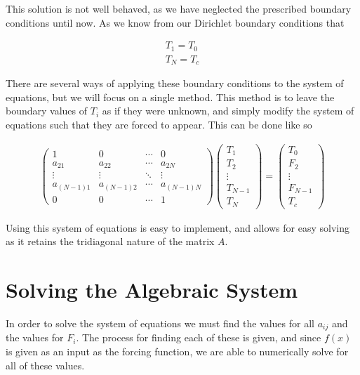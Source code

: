 \documentclass[10pt]{amsart}
\numberwithin{equation}{section}
\theoremstyle{definition}
\begin{document}
\begin{multicols}{2}
This solution is not well behaved, as we have neglected the prescribed boundary
conditions until now. As we know from our Dirichlet boundary conditions that

\begin{align*}
  T_1=T_0\\
  T_N=T_c
\end{align*}

There are several ways of applying these boundary conditions to the system of
equations, but we will focus on a single method. This method is to leave the
boundary values of $T_i$ as if they were unknown, and simply modify the system
of equations such that they are forced to appear. This can be done like so

\begin{align*}
  \begin{pmatrix}
    1 & 0 & \cdots & 0\\
    a_{21} & a_{22} & \cdots & a_{2N}\\
    \vdots & \vdots & \ddots & \vdots \\
    a_{(N-1)1} & a_{(N-1)2} & \cdots & a_{(N-1)N}\\
    0 & 0 & \cdots & 1
  \end{pmatrix}
  \begin{pmatrix}
    T_1 \\ T_2 \\ \vdots \\ T_{N-1} \\ T_N
  \end{pmatrix}
  =
  \begin{pmatrix}
    T_0 \\ F_2 \\ \vdots \\ F_{N-1} \\ T_c
  \end{pmatrix}
\end{align*}

Using this system of equations is easy to implement, and allows for easy
solving as it retains the tridiagonal nature of the matrix $A$.

\section{Solving the Algebraic System}%
\label{sec:solving_the_algebraic_system}

In order to solve the system of equations we must find the values for all
$a_{ij}$ and the values for $F_{i}$. The process for finding each of these is
given, and since $f(x)$ is given as an input as the forcing function, we are
able to numerically solve for all of these values.


\end{multicols}
\end{document}
